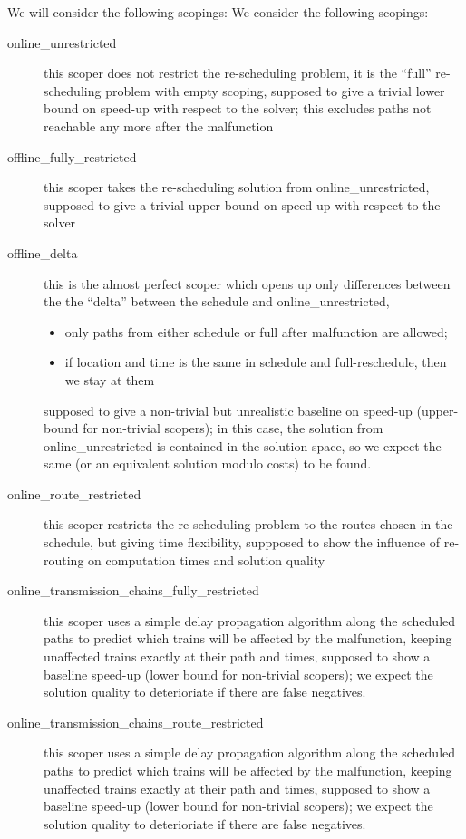 \documentclass{article}
\begin{document}
We will consider the following scopings:
We consider the following scopings:
\begin{description}
\item[online\_unrestricted] this scoper does not restrict the re-scheduling problem, it is the ``full'' re-scheduling problem with empty scoping, supposed to give a trivial lower bound on speed-up with respect to the solver; this excludes paths not reachable any more after the malfunction
\item[offline\_fully\_restricted] this scoper takes the re-scheduling solution from online\_unrestricted, supposed to give a trivial upper bound on speed-up with respect to the solver
\item[offline\_delta]  this is the almost perfect scoper which opens up only differences between the  the ``delta'' between the schedule and online\_unrestricted,
\begin{itemize}
    \item only paths from either schedule or full after malfunction are allowed;
    \item if location and time is the same in schedule and full-reschedule, then we stay at them
\end{itemize}
supposed to give a non-trivial but unrealistic baseline on speed-up (upper-bound for non-trivial scopers); in this case, the solution from online\_unrestricted is contained in the solution space, so we expect the same (or an equivalent solution modulo costs) to be found.
\item[online\_route\_restricted] this scoper restricts the re-scheduling problem to the routes chosen in the schedule, but giving time flexibility, suppposed to show the influence of re-routing on computation times and solution quality
\item[online\_transmission\_chains\_fully\_restricted] this scoper uses a simple delay propagation algorithm along the scheduled paths to predict which trains will be affected by the malfunction, keeping unaffected trains exactly at their path and times, supposed to show a baseline speed-up (lower bound for non-trivial scopers); we expect the solution quality to deterioriate if there are false negatives.
\item[online\_transmission\_chains\_route\_restricted] this scoper uses a simple delay propagation algorithm along the scheduled paths to predict which trains will be affected by the malfunction, keeping unaffected trains exactly at their path and times, supposed to show a baseline speed-up (lower bound for non-trivial scopers); we expect the solution quality to deterioriate if there are false negatives.

\end{description}
\end{document}
